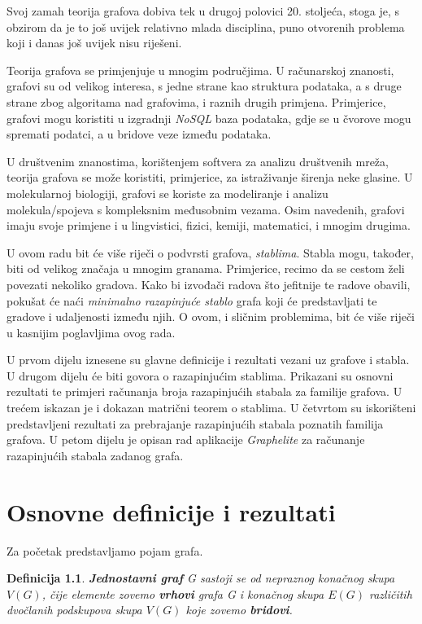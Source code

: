 \documentclass[times, utf8, zavrsni]{fer}
\newtheorem{definition}{Definicija}[section]
\begin{document}
Svoj zamah teorija grafova dobiva tek u drugoj polovici 20. stoljeća, stoga je, s obzirom da je to još uvijek relativno mlada disciplina, puno otvorenih problema koji i danas još uvijek nisu riješeni.

Teorija grafova se primjenjuje u mnogim područjima. U računarskoj znanosti, grafovi su od velikog interesa, s jedne strane kao struktura podataka, a s druge strane zbog algoritama nad grafovima, i raznih drugih primjena. Primjerice, grafovi mogu koristiti u izgradnji \textit{NoSQL} baza podataka, gdje se u čvorove mogu spremati podatci, a u bridove veze između podataka.

U društvenim znanostima, korištenjem softvera za analizu društvenih mreža, teorija grafova se može koristiti, primjerice, za istraživanje širenja neke glasine. U molekularnoj biologiji, grafovi se koriste za modeliranje i analizu molekula/spojeva s kompleksnim međusobnim vezama. Osim navedenih, grafovi imaju svoje primjene i u lingvistici, fizici, kemiji, matematici, i mnogim drugima.

U ovom radu bit će više riječi o podvrsti grafova, \textit{stablima}. Stabla mogu, također, biti od velikog značaja u mnogim granama. Primjerice, recimo da se cestom želi povezati nekoliko gradova. Kako bi izvođači radova što jefitnije te radove obavili, pokušat će naći \textit{minimalno razapinjuće stablo} grafa koji će predstavljati te gradove i udaljenosti između njih. O ovom, i sličnim problemima, bit će više riječi u kasnijim poglavljima ovog rada.

U prvom dijelu iznesene su glavne definicije i rezultati vezani uz grafove i stabla. U drugom dijelu će biti govora o razapinjućim stablima. Prikazani su osnovni rezultati te primjeri računanja broja razapinjućih stabala za familije grafova. 
U trećem iskazan je i dokazan matrični teorem o stablima.
U četvrtom su iskorišteni predstavljeni rezultati za prebrajanje razapinjućih stabala poznatih familija grafova. U petom dijelu je opisan rad aplikacije \textit{Graphelite} za računanje razapinjućih stabala zadanog grafa.

\chapter{Osnovne definicije i rezultati}

Za početak predstavljamo pojam grafa.

\begin{definition}
	\textbf{Jednostavni graf} G sastoji se od nepraznog konačnog skupa $V(G)$, čije elemente zovemo \textbf{vrhovi} grafa G i konačnog skupa $E(G)$ različitih dvočlanih podskupova skupa $V(G)$ koje zovemo \textbf{bridovi}.
\end{definition}
\end{document}
